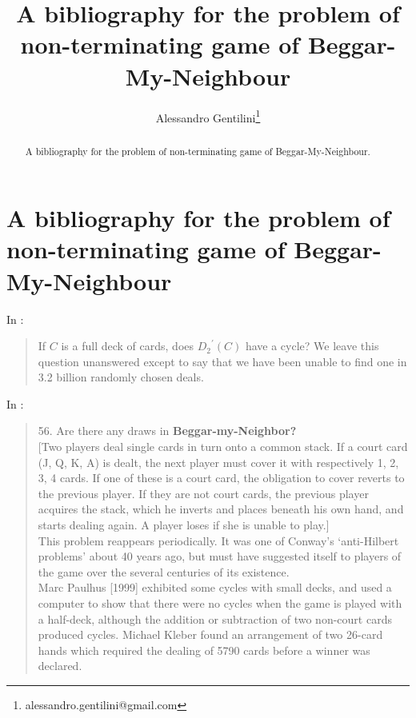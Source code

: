 \documentclass[a4paper,12pt]{article}
\title{A bibliography for the problem of non-terminating game of Beggar-My-Neighbour}
\author{Alessandro Gentilini\thanks{alessandro.gentilini@gmail.com}}
\begin{document}
\maketitle

\begin{abstract}
A bibliography for the problem of non-terminating game of Beggar-My-Neighbour.
\end{abstract} 

\section{A bibliography for the problem of non-terminating game of 
Beggar-My-Neighbour}

In \cite[p.164]{paulhus1999beggar}:
\begin{quotation}
If $C$ is a full deck of cards, does ${D_{2}}^{'}(C)$ have a cycle? We leave 
this question unanswered except to say that we have been unable to find one in 
3.2 billion randomly chosen deals.
\end{quotation}

In \cite[p.472]{nowakowski2002more}:
\begin{quotation}
56. Are there any draws in \textbf{Beggar-my-Neighbor?}\\ 

[Two players deal single cards in turn onto a common stack. If a court card (J,
Q, K, A) is dealt, the next player must cover it with respectively 1, 2, 3, 4 
cards. If one of these is a court card, the obligation to cover reverts to the 
previous player. If they are not court cards, the previous player acquires the 
stack, which he inverts and places beneath his own hand, and starts dealing 
again. A player loses if she is unable to play.]\\

This problem reappears periodically. It was one of Conway’s 
‘anti-Hilbert problems’ about 40 years ago, but must have suggested itself to 
players of the game over the several centuries of its existence.\\

Marc Paulhus [1999] exhibited some cycles with small decks, and used a computer 
to show that there were no cycles when the game is played with a half-deck, 
although the addition or subtraction of two non-court cards produced cycles. 
Michael Kleber found an arrangement of two 26-card hands which required the 
dealing of 5790 cards before a winner was declared.
\end{quotation}
\end{document}
